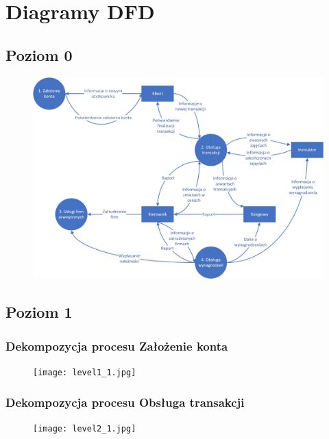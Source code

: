 \documentclass[a4paper,11pt]{article}
\begin{document}
\section{Diagramy DFD}
\subsection{Poziom 0}
    \begin{figure}[!htb]
    \centerline{\includegraphics[scale=0.9]{level0.jpg}}
    \label{fig:level0}
    \end{figure}
\newpage



\subsection{Poziom 1}
\subsubsection{Dekompozycja procesu Założenie konta}
    \begin{figure}[!htb]
    \centerline{\texttt{[image: level1\_1.jpg]}}
    \label{fig:level1_1}
    \end{figure}
    \newpage



\subsubsection{Dekompozycja procesu Obsługa transakcji}
    \begin{figure}[!htb]
    \centerline{\texttt{[image: level2\_1.jpg]}}
    \label{fig:level1_2}
    \end{figure}
    \newpage
\end{document}
